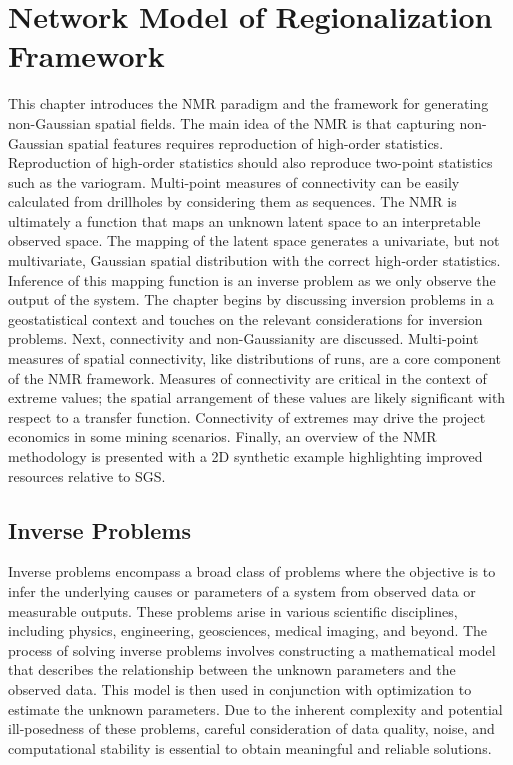 
\chapter{Network Model of Regionalization Framework}
\label{ch:03framework}

This chapter introduces the \gls{NMR} paradigm and the framework for generating non-Gaussian spatial fields. The main idea of the \gls{NMR} is that capturing non-Gaussian spatial features requires reproduction of high-order statistics. Reproduction of high-order statistics should also reproduce two-point statistics such as the variogram. Multi-point measures of connectivity can be easily calculated from drillholes by considering them as sequences. The \gls{NMR} is ultimately a function that maps an unknown latent space to an interpretable observed space. The mapping of the latent space generates a univariate, but not multivariate, Gaussian spatial distribution with the correct high-order statistics. Inference of this mapping function is an inverse problem as we only observe the output of the system. The chapter begins by discussing inversion problems in a geostatistical context and touches on the relevant considerations for inversion problems. Next, connectivity and non-Gaussianity are discussed. Multi-point measures of spatial connectivity, like distributions of runs, are a core component of the \gls{NMR} framework. Measures of connectivity are critical in the context of extreme values; the spatial arrangement of these values are likely significant with respect to a transfer function. Connectivity of extremes may drive the project economics in some mining scenarios. Finally, an overview of the \gls{NMR} methodology is presented with a \gls{2D} synthetic example highlighting improved resources relative to \gls{SGS}.


\FloatBarrier
\section{Inverse Problems}
\label{sec:03inverse}

Inverse problems encompass a broad class of problems where the objective is to infer the underlying causes or parameters of a system from observed data or measurable outputs. These problems arise in various scientific disciplines, including physics, engineering, geosciences, medical imaging, and beyond. The process of solving inverse problems involves constructing a mathematical model that describes the relationship between the unknown parameters and the observed data. This model is then used in conjunction with optimization to estimate the unknown parameters. Due to the inherent complexity and potential ill-posedness of these problems, careful consideration of data quality, noise, and computational stability is essential to obtain meaningful and reliable solutions.

